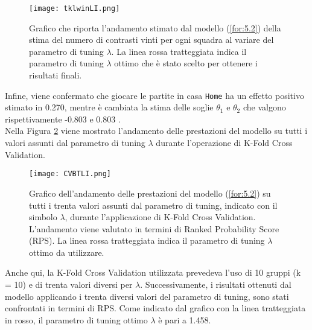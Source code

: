 \begin{figure}[htbp]
	\begin{center}
		\texttt{[image: tklwinLI.png]}
		\caption{Grafico che riporta l'andamento stimato dal modello (\ref{for:5.2}) della stima del numero di contrasti vinti per ogni squadra al variare del parametro di tuning $\lambda$. La linea rossa tratteggiata indica il parametro di tuning $\lambda$ ottimo che è stato scelto per ottenere i risultati finali.} \label{fig:tklwinLI}
	\end{center}
\end{figure}
Infine, viene confermato che giocare le partite in casa \texttt{Home} ha un effetto positivo stimato in 0.270, mentre è cambiata la stima delle soglie $\theta_1$ e $\theta_2$ che valgono rispettivamente -0.803  e 0.803 .\\
Nella Figura \ref{fig:lambda2} viene mostrato l'andamento delle prestazioni del modello su tutti i valori assunti dal parametro di tuning $\lambda$ durante l'operazione di K-Fold Cross Validation.
\begin{figure}[h]
	\begin{center}
		\texttt{[image: CVBTLI.png]}
		\caption{Grafico dell'andamento delle prestazioni del modello (\ref{for:5.2}) su tutti i trenta valori assunti dal parametro di tuning, indicato con il simbolo $\lambda$, durante l'applicazione di K-Fold Cross Validation. L'andamento viene valutato in termini di Ranked Probability Score (RPS). La linea rossa tratteggiata indica il parametro di tuning $\lambda$ ottimo da utilizzare.} \label{fig:lambda2}
	\end{center}
\end{figure}
Anche qui, la K-Fold Cross Validation utilizzata prevedeva l'uso di 10 gruppi (k = 10) e di trenta valori diversi per $\lambda$. Successivamente, i risultati ottenuti dal modello applicando i trenta diversi valori del parametro di tuning, sono stati confrontati in termini di RPS. Come indicato dal grafico con la linea tratteggiata in rosso, il parametro di tuning ottimo $\lambda$ è pari a 1.458.\\

